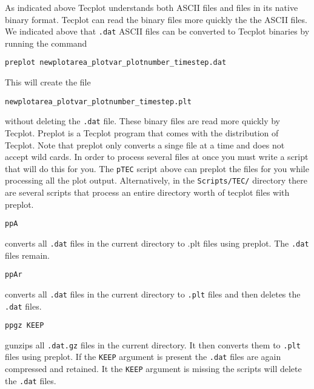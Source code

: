 As indicated above Tecplot understands both ASCII files and files in its
native binary format.  Tecplot can read the binary files more quickly
the the ASCII files.  We indicated above that {\tt .dat} ASCII files 
can be converted to Tecplot binaries by running the command
\begin{verbatim}
preplot newplotarea_plotvar_plotnumber_timestep.dat
\end{verbatim}
This will create the file 
\begin{verbatim}
newplotarea_plotvar_plotnumber_timestep.plt
\end{verbatim}
without deleting the {\tt .dat} file. These binary files are read more
quickly by Tecplot.  Preplot is a Tecplot program that comes with the
distribution of Tecplot.  Note that preplot only converts a singe file
at a time and does not accept wild cards.  In order to process several
files at once you must write a script that will do this for you.  The
{\tt pTEC} script above can preplot the files for you while processing
all the plot output.  Alternatively, in the {\tt Scripts/TEC/}
directory there are several scripts that process an entire directory
worth of tecplot files with preplot. 
\begin{verbatim}
ppA
\end{verbatim}
converts all {\tt .dat} files in the current directory to .plt files using
preplot. The {\tt .dat} files remain.
\begin{verbatim}
ppAr
\end{verbatim}
converts all {\tt .dat} files in the current directory to {\tt .plt} files 
and then deletes the {\tt .dat} files.
\begin{verbatim}
ppgz KEEP
\end{verbatim}
gunzips all {\tt .dat.gz} files in the current directory.  It then
converts them to {\tt .plt} files using preplot.  If the {\tt KEEP} argument
is present the {\tt .dat} files are again compressed and retained.  It the 
{\tt KEEP} argument is missing the scripts will delete the {\tt .dat} files.



